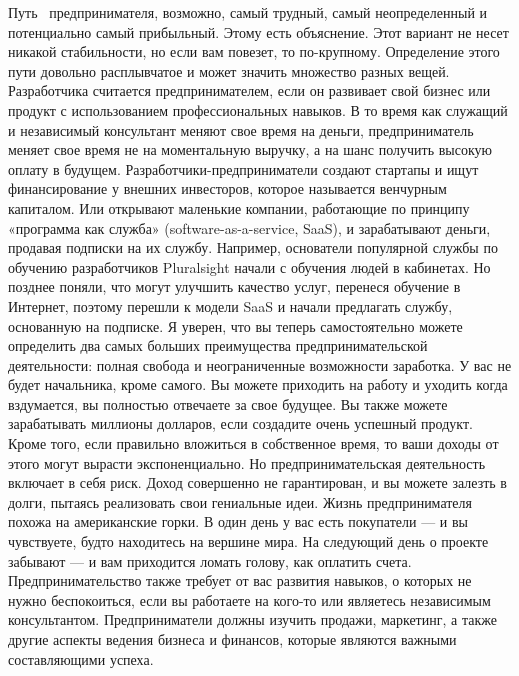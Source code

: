 \documentclass{../industrial-development}
\begin{document}
\lecturenotes
Путь~\cite[с.~62--67]{Sonmez} предпринимателя, возможно, самый трудный, самый неопределенный и потенциально самый прибыльный. Этому есть объяснение. Этот вариант не несет никакой стабильности, но если вам повезет, то по-крупному.
Определение этого пути довольно расплывчатое и может значить множество разных вещей. Разработчика считается предпринимателем, если он развивает свой бизнес или продукт с использованием профессиональных навыков. В то время как служащий и независимый консультант меняют свое время на деньги, предприниматель меняет свое время не на моментальную выручку, а на шанс получить высокую оплату в будущем.
Разработчики-предприниматели создают стартапы и ищут финансирование у внешних инвесторов, которое называется венчурным капиталом. Или открывают маленькие компании, работающие по принципу «программа как служба» (software-as-a-service, SaaS), и зарабатывают деньги, продавая подписки на их службу. Например, основатели популярной службы по обучению разработчиков Pluralsight начали с обучения людей в кабинетах. Но позднее поняли, что могут улучшить качество услуг, перенеся обучение в Интернет, поэтому перешли к модели SaaS и начали предлагать службу, основанную на подписке.
Я уверен, что вы теперь самостоятельно можете определить два самых больших преимущества предпринимательской деятельности: полная свобода и неограниченные возможности заработка. У вас не будет начальника, кроме самого. Вы можете приходить на работу и уходить когда вздумается, вы полностью отвечаете за свое будущее. Вы также можете зарабатывать миллионы долларов, если создадите очень успешный продукт. Кроме того, если правильно вложиться в собственное время, то ваши доходы от этого могут вырасти экспоненциально.
Но предпринимательская деятельность включает в себя риск. Доход совершенно не гарантирован, и вы можете залезть в долги, пытаясь реализовать свои гениальные идеи. Жизнь предпринимателя похожа на американские горки. В один день у вас есть покупатели — и вы чувствуете, будто находитесь на вершине мира. На следующий день о проекте забывают — и вам приходится ломать голову, как оплатить счета.
Предпринимательство также требует от вас развития навыков, о которых не нужно беспокоиться, если вы работаете на кого-то или являетесь независимым консультантом. Предприниматели должны изучить продажи, маркетинг, а также другие аспекты ведения бизнеса и финансов, которые являются важными составляющими успеха. 

\end{document}
